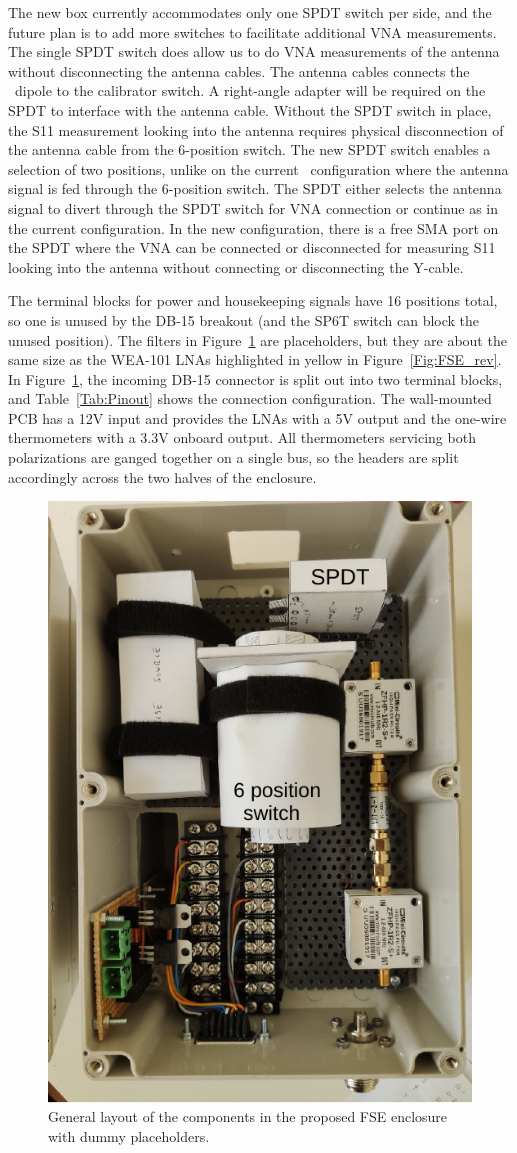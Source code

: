 The new box currently accommodates only one SPDT switch per side, and the future plan is to add more switches to facilitate additional VNA measurements. The single SPDT switch does allow us to do VNA measurements of the antenna without disconnecting the antenna cables. The antenna cables connects the \prizm\ dipole to the calibrator switch. A right-angle adapter will be required on the SPDT to interface with the antenna cable. Without the SPDT switch in place, the S11 measurement looking into the antenna requires physical disconnection of the antenna cable from the 6-position switch. The new SPDT switch enables a selection of two positions, unlike on the current \prizm\ configuration where the antenna signal is fed through the 6-position switch. The SPDT either selects the antenna signal to divert through the SPDT switch for VNA connection or continue as in the current configuration. In the new configuration, there is a free SMA port on the SPDT where the VNA can be connected or disconnected for measuring S11 looking into the antenna without connecting or disconnecting the Y-cable. 

The terminal blocks for power and housekeeping signals have 16 positions total, so one is unused by the DB-15 breakout (and the SP6T switch can block the unused position). The filters in Figure~\ref{Fig:FSE_archi} are placeholders, but they are about the same size as the WEA-101 LNAs highlighted in yellow in Figure~\ref{Fig:FSE_rev}. In Figure~\ref{Fig:FSE_archi}, the incoming DB-15 connector is split out into two terminal blocks, and Table~\ref{Tab:Pinout} shows the connection configuration. The wall-mounted PCB has a 12V input and provides the LNAs with a 5V output and the one-wire thermometers with a 3.3V onboard output. All thermometers servicing both polarizations are ganged together on a single bus, so the headers are split accordingly across the two halves of the enclosure.

\begin{figure}
	\centering
	\includegraphics[width=0.5\linewidth]{Figures/FSE_archi}
	\caption{General layout of the components in the proposed FSE enclosure with dummy placeholders.}
	\label{Fig:FSE_archi}
\end{figure}

